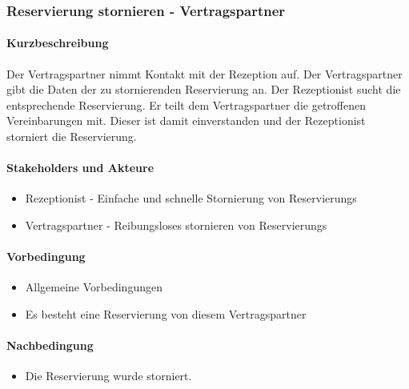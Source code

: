 \subsubsection{Reservierung stornieren - Vertragspartner}

\paragraph{Kurzbeschreibung}
Der \Gls{Vertragspartner} nimmt Kontakt mit der \Gls{Rezeption} auf. Der \Gls{Vertragspartner} gibt die Daten der zu stornierenden Reservierung an. Der \Gls{Rezeptionist} sucht die entsprechende \Gls{Reservierung}. Er teilt dem \Gls{Vertragspartner} die getroffenen Vereinbarungen mit. Dieser ist damit einverstanden und der \Gls{Rezeptionist} storniert die \Gls{Reservierung}.

\paragraph{Stakeholders und Akteure}
\begin{itemize}
\item \Gls{Rezeptionist} - Einfache und schnelle Stornierung von \Glspl{Reservierung}
\item \Gls{Vertragspartner} - Reibungsloses stornieren von \Glspl{Reservierung}
\end{itemize}

\paragraph{Vorbedingung}
\begin{itemize}
\item Allgemeine Vorbedingungen
\item Es besteht eine \Gls{Reservierung} von diesem \Gls{Vertragspartner}
\end{itemize}

\paragraph{Nachbedingung}
\begin{itemize}
\item Die \Gls{Reservierung} wurde storniert.
\end{itemize}

